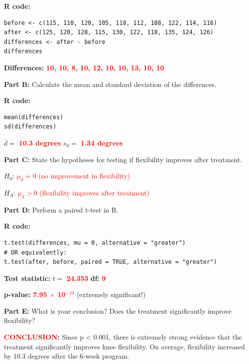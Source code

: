 \documentclass[11pt]{article}
\begin{document}
\textbf{R code:}
\begin{lstlisting}
before <- c(115, 110, 120, 105, 118, 112, 108, 122, 114, 116)
after <- c(125, 120, 128, 115, 130, 122, 118, 135, 124, 126)
differences <- after - before
differences
\end{lstlisting}

\textbf{Differences:} \textcolor{red}{\textbf{10, 10, 8, 10, 12, 10, 10, 13, 10, 10}}

\vspace{0.5cm}

\textbf{Part B:} Calculate the mean and standard deviation of the differences.

\textbf{R code:}
\begin{lstlisting}
mean(differences)
sd(differences)
\end{lstlisting}

$\bar{d} = $ \textcolor{red}{\textbf{10.3 degrees}} \hspace{2cm} $s_d = $ \textcolor{red}{\textbf{1.34 degrees}}

\vspace{0.5cm}

\textbf{Part C:} State the hypotheses for testing if flexibility improves after treatment.

$H_0$: \textcolor{red}{$\mu_d = 0$ (no improvement in flexibility)}

$H_A$: \textcolor{red}{$\mu_d > 0$ (flexibility improves after treatment)}

\vspace{0.5cm}

\textbf{Part D:} Perform a paired t-test in R.

\textbf{R code:}
\begin{lstlisting}
t.test(differences, mu = 0, alternative = "greater")
# OR equivalently:
t.test(after, before, paired = TRUE, alternative = "greater")
\end{lstlisting}

\textbf{Test statistic:} $t = $ \textcolor{red}{\textbf{24.353}} \hspace{1cm} \textbf{df:} \textcolor{red}{\textbf{9}}

\textbf{p-value:} \textcolor{red}{\textbf{7.95 $\times$ 10$^{-10}$}} (extremely significant!)

\vspace{0.5cm}

\textbf{Part E:} What is your conclusion? Does the treatment significantly improve flexibility?

\textcolor{red}{\textbf{CONCLUSION:}} Since p < 0.001, there is extremely strong evidence that the treatment significantly improves knee flexibility. On average, flexibility increased by 10.3 degrees after the 6-week program.
\end{document}
